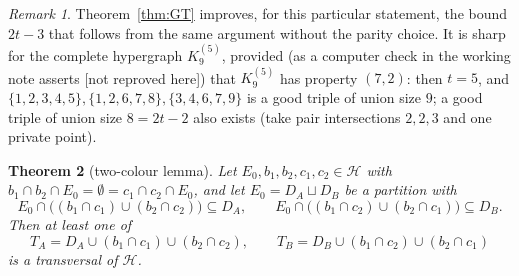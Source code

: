 \documentclass[11pt]{amsart}
\newtheorem{theorem}{Theorem}[section]
\theoremstyle{definition}
\theoremstyle{remark}
\newtheorem{remark}[theorem]{Remark}
\newcommand{\cH}{\mathcal H}
\begin{document}
\begin{remark}
Theorem~\ref{thm:GT} improves, for this particular statement, the bound $2t-3$ that follows from the same argument without the parity choice. It is sharp for the complete hypergraph $K^{(5)}_9$, provided (as a computer check in the working note asserts [not reproved here]) that $K^{(5)}_9$ has property $(7,2)$: then $t=5$, and $\{1,2,3,4,5\},\{1,2,6,7,8\},\{3,4,6,7,9\}$ is a good triple of union size $9$; a good triple of union size $8=2t-2$ also exists (take pair intersections $2,2,3$ and one private point).
\end{remark}

\begin{theorem}[two-colour lemma]\label{thm:TC}
Let $E_0,b_1,b_2,c_1,c_2\in\cH$ with $b_1\cap b_2\cap E_0=\emptyset=c_1\cap c_2\cap E_0$, and let $E_0=D_A\sqcup D_B$ be a partition with
\[
E_0\cap\bigl((b_1\cap c_1)\cup(b_2\cap c_2)\bigr)\subseteq D_A,\qquad E_0\cap\bigl((b_1\cap c_2)\cup(b_2\cap c_1)\bigr)\subseteq D_B .
\]
Then at least one of
\[
T_A=D_A\cup(b_1\cap c_1)\cup(b_2\cap c_2),\qquad T_B=D_B\cup(b_1\cap c_2)\cup(b_2\cap c_1)
\]
is a transversal of $\cH$.
\end{theorem}
\end{document}
